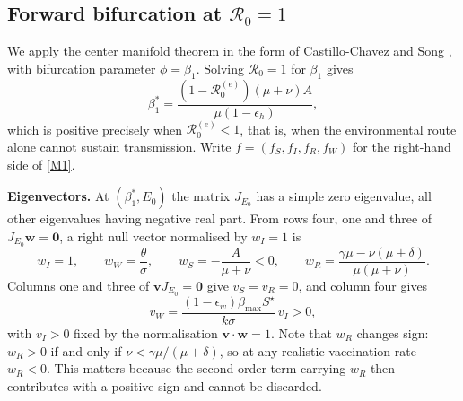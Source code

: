 \documentclass[11pt]{article}
\theoremstyle{plain}
\theoremstyle{definition}
\theoremstyle{remark}
\newcommand{\Rz}{\mathcal{R}_0}
\newcommand{\Rze}{\mathcal{R}_0^{(e)}}
\begin{document}
\subsection{Forward bifurcation at $\Rz=1$}\label{subsec:bifurcation}

We apply the center manifold theorem in the form of Castillo-Chavez and Song \cite{castilloChavezSong2004}, with bifurcation parameter $\phi=\beta_1$. Solving $\Rz=1$ for $\beta_1$ gives
\begin{equation}\label{eq:beta1star}
\beta_1^*=\frac{(1-\Rze)(\mu+\nu)A}{\mu(1-\epsilon_h)},
\end{equation}
which is positive precisely when $\Rze<1$, that is, when the environmental route alone cannot sustain transmission. Write $f=(f_S,f_I,f_R,f_W)$ for the right-hand side of \eqref{M1}.

\textbf{Eigenvectors.} At $(\beta_1^*,E_0)$ the matrix $J_{E_0}$ has a simple zero eigenvalue, all other eigenvalues having negative real part. From rows four, one and three of $J_{E_0}\mathbf{w}=\mathbf{0}$, a right null vector normalised by $w_I=1$ is
\begin{equation}\label{eq:rightvec}
w_I=1,\qquad w_W=\frac{\theta}{\sigma},\qquad
w_S=-\frac{A}{\mu+\nu}<0,\qquad
w_R=\frac{\gamma\mu-\nu(\mu+\delta)}{\mu(\mu+\nu)} .
\end{equation}
Columns one and three of $\mathbf{v}J_{E_0}=\mathbf{0}$ give $v_S=v_R=0$, and column four gives
\begin{equation}\label{eq:leftvec}
v_W=\frac{(1-\epsilon_w)\beta_{\max}S^\star}{k\sigma}\,v_I>0,
\end{equation}
with $v_I>0$ fixed by the normalisation $\mathbf{v}\cdot\mathbf{w}=1$. Note that $w_R$ changes sign: $w_R>0$ if and only if $\nu<\gamma\mu/(\mu+\delta)$, so at any realistic vaccination rate $w_R<0$. This matters because the second-order term carrying $w_R$ then contributes with a positive sign and cannot be discarded.
\end{document}
